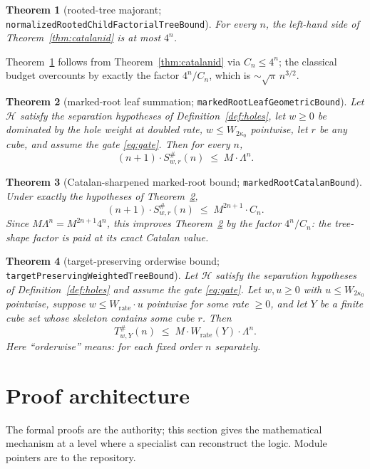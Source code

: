 \documentclass[11pt]{article}
\newtheorem{theorem}{Theorem}[section]
\newcommand{\lean}[1]{\texttt{#1}}
\newcommand{\holes}{\mathcal{H}}
\begin{document}
\begin{theorem}[rooted-tree majorant;
\lean{normalizedRootedChildFactorialTreeBound}]\label{thm:tree}
For every $n$, the left-hand side of Theorem~\ref{thm:catalanid} is
at most $4^n$.
\end{theorem}

Theorem~\ref{thm:tree} follows from Theorem~\ref{thm:catalanid} via
$C_n \le 4^n$; the classical budget overcounts by exactly the factor
$4^n/C_n$, which is $\sim \sqrt{\pi}\, n^{3/2}$.

\begin{theorem}[marked-root leaf summation;
\lean{markedRootLeafGeometricBound}]\label{thm:markedroot}
Let $\holes$ satisfy the separation hypotheses of
Definition~\ref{def:holes}, let $w \ge 0$ be dominated by the hole
weight at doubled rate, $w \le W_{2\kappa_0}$ pointwise, let $r$ be
any cube, and assume the gate \eqref{eq:gate}.  Then for every $n$,
\[
(n+1) \cdot S^{\#}_{w,r}(n) \;\le\; M \cdot \Lambda^{n}.
\]
\end{theorem}

\begin{theorem}[Catalan-sharpened marked-root bound;
\lean{markedRootCatalanBound}]\label{thm:markedrootcat}
Under exactly the hypotheses of Theorem~\ref{thm:markedroot},
\[
(n+1) \cdot S^{\#}_{w,r}(n) \;\le\; M^{2n+1} \cdot C_n .
\]
Since $M \Lambda^n = M^{2n+1} 4^n$, this improves
Theorem~\ref{thm:markedroot} by the factor $4^n/C_n$: the tree-shape
factor is paid at its exact Catalan value.
\end{theorem}

\begin{theorem}[target-preserving orderwise bound;
\lean{targetPreservingWeightedTreeBound}]\label{thm:target}
Let $\holes$ satisfy the separation hypotheses of
Definition~\ref{def:holes} and assume the gate \eqref{eq:gate}.  Let
$w, u \ge 0$ with $u \le W_{2\kappa_0}$ pointwise, suppose $w \le
W_{\mathrm{rate}} \cdot u$ pointwise for some rate $\ge 0$, and let
$Y$ be a finite cube set whose skeleton contains some cube $r$.  Then
\[
T^{\#}_{w,Y}(n) \;\le\; M \cdot W_{\mathrm{rate}}(Y)
\cdot \Lambda^{n}.
\]
Here ``orderwise'' means: for each fixed order $n$ separately.
\end{theorem}

\section{Proof architecture}\label{sec:architecture}

The formal proofs are the authority; this section gives the
mathematical mechanism at a level where a specialist can reconstruct
the logic.  Module pointers are to the repository.
\end{document}
